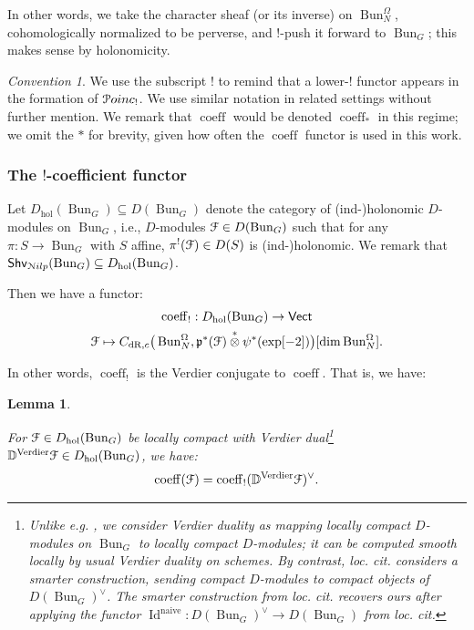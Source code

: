 \documentclass[reqno,11pt]{amsart}
\numberwithin{equation}{subsection}
\newtheorem{lem}[thm]{Lemma}
\theoremstyle{remark}
\newtheorem{convention}[thm]{Convention}
\newcommand{\bD}{{\mathbb D}}
\newcommand{\sF}{{\EuScript F}}
\newcommand{\sN}{{\EuScript N}}
\newcommand{\sP}{{\EuScript P}}
\newcommand{\fp}{{\mathfrak p}}
\newcommand{\on}{\operatorname}
\newcommand{\Vect}{\mathsf{Vect}}
\newcommand{\Bun}{\on{Bun}}
\renewcommand{\subset}{\subseteq}
\newcommand{\coeff}{\on{coeff}}
\newcommand{\Poinc}{\sP oinc}
\newcommand{\Shv}{\mathsf{Shv}}
\newcommand{\Nilp}{\sN ilp}
\newcommand{\dR}{\on{dR}}
\newcommand{\hol}{\on{hol}}
\begin{document}
\noindent In other words, we take the character sheaf (or its inverse) 
on $\Bun_N^{\Omega}$,
cohomologically normalized to be perverse,
and $!$-push it forward to $\Bun_G$; this makes sense by holonomicity.

\begin{convention}

We use the subscript $!$ to remind that a lower-$!$ functor appears
in the formation of $\Poinc_!$. We use similar notation in related
settings without further mention. We remark that $\coeff$ would
be denoted $\coeff_*$ in this regime; we omit the $*$ for brevity, given
how often the $\coeff$ functor is used in this work.

\end{convention}

\subsubsection{The $!$-coefficient functor}

Let $D_{\hol}(\Bun_G) \subset D(\Bun_G)$ 
denote the category of (ind-)holonomic $D$-modules on $\Bun_G$,
i.e., $D$-modules $\sF \in D(\Bun_G)$ such that for
any $\pi:S \to \Bun_G$ with $S$ affine, $\pi^!(\sF) \in D(S)$ is (ind-)holonomic.
We remark that $\Shv_{\Nilp}(\Bun_G) \subset D_{\hol}(\Bun_G)$.

Then we have a functor:
%
\[
\begin{gathered}
\coeff_!:D_{\hol}(\Bun_G) \to \Vect \\
\sF \mapsto 
C_{\dR,c}\big(\Bun_N^{\Omega},\fp^*(\sF) \overset{*}{\otimes} \psi^*(\exp[-2])\big)
[\dim  \Bun_N^{\Omega}].
\end{gathered}
\]

In other words, $\coeff_!$ is the Verdier conjugate to $\coeff$. That is,
we have:

\begin{lem}\label{l:coeff-!-verdier}

For $\sF \in D_{\hol}(\Bun_G)$ be locally compact
with Verdier dual\footnote{Unlike e.g. \cite{agkrrv2}, we consider
Verdier duality as mapping locally compact $D$-modules on $\Bun_G$ 
to locally compact $D$-modules; it can be computed smooth locally by 
usual Verdier duality on schemes. By contrast, \emph{loc. cit}. considers
a smarter construction, sending compact $D$-modules to compact objects
of $D(\Bun_G)^{\vee}$. The smarter construction from \emph{loc. cit}.
recovers ours after applying the functor 
$\on{Id}^{\on{naive}}:D(\Bun_G)^{\vee} \to D(\Bun_G)$ from 
\emph{loc. cit}.}
$\bD^{\on{Verdier}} \sF \in D_{\hol}(\Bun_G)$, 
we have:
%
\[
\coeff(\sF) = \coeff_!(\bD^{\on{Verdier}} \sF)^{\vee}.
\]

\end{lem}
\end{document}
